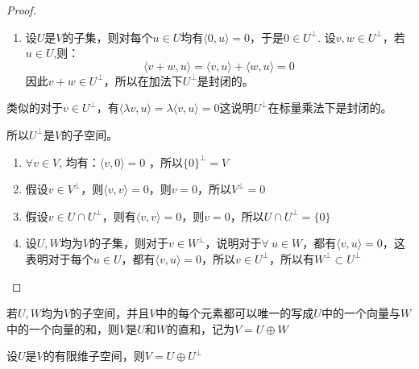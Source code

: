 \documentclass[10pt,a4paper,UTF8]{article}
\begin{document}
\begin{proof}
\begin{enumerate}
\item 设\(U\)是\(V\)的子集，则对每个\(u\in U\)均有\(\langle 0,u \rangle = 0\)，于是\(0 \in U^{\perp}\). 设\(v,w\in U^{\perp}\)，若\(u\in U\),则：\[ \langle v+w,u \rangle = \langle v,u \rangle  + \langle w,u \rangle  = 0\] 因此\(v+w\in U^{\perp}\)，所以在加法下\(U^{\perp}\)是封闭的。
\end{enumerate}

类似的对于\(v\in U^{\perp}\)，有\(\langle \lambda v,u \rangle = \lambda \langle v,u \rangle  = 0\)这说明\(U^{\perp}\)在标量乘法下是封闭的。

所以\(U^{\perp}\)是\(V\)的子空间。

\begin{enumerate}
\item \(\forall v\in V\), 均有：\(\langle v,0 \rangle = 0\) ，所以\(\{0\}^{\perp} = V\)
\item 假设\(v\in V^{\perp}\)，则\(\langle v,v \rangle  = 0\)，则\(v=0\)，所以\(V^{\perp} = 0\)
\item 假设\(v\in U\cap U^{\perp}\)，则有\(\langle v,v \rangle   = 0\)，则\(v = 0\)，所以\(U \cap U^{\perp} = \{0\}\)
\item 设\(U,W\)均为\(V\)的子集，则对于\(v\in W^{\perp}\)，说明对于\(\forall~u\in W\)，都有\(\langle v,u \rangle = 0\)，这表明对于每个\(u\in U\)，都有\(\langle v,u \rangle  = 0\)，所以\(v \in U^{\perp}\)，所以有\(W^{\perp} \subset U^{\perp}\)
\end{enumerate}
\end{proof}

若\(U,W\)均为\(V\)的子空间，并且\(V\)中的每个元素都可以唯一的写成\(U\)中的一个向量与\(W\)中的一个向量的和，则\(V\)是\(U\)和\(W\)的直和，记为\(V = U\oplus W\)

\begin{theorem}
设\(U\)是\(V\)的有限维子空间，则\(V = U \oplus U^{\perp}\)
\end{theorem}
\end{document}
